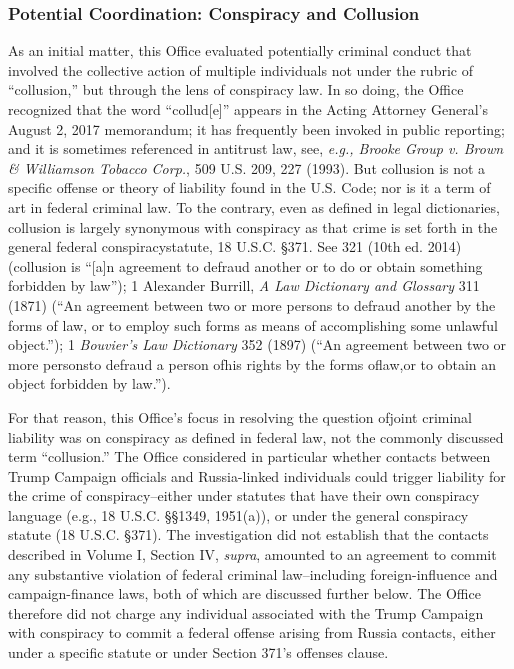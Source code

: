 \subsubsection{Potential Coordination: Conspiracy and Collusion}
As an initial matter, this Office evaluated potentially criminal conduct that involved the collective action of multiple individuals not under the rubric of ``collusion,'' but through the lens of conspiracy law. 
In so doing, the Office recognized that the word ``collud[e]'' appears in the Acting Attorney General's August 2, 2017 memorandum; it has frequently been invoked in public reporting; and it is sometimes referenced in antitrust law, see, \textit{e.g., Brooke Group v. Brown \& Williamson Tobacco Corp.}, 509 U.S. 209, 227 (1993). 
But collusion is not a specific offense or theory of liability found in the U.S. Code; nor is it a term of art in federal criminal law. 
To the contrary, even as defined in legal dictionaries, collusion is largely synonymous with conspiracy as that crime is set forth in the general federal conspiracystatute, 18 U.S.C. \S 371. 
See  321 (10th ed. 2014) (collusion is ``[a]n agreement to defraud another or to do or obtain something forbidden by law''); 1 Alexander Burrill, \textit{A Law Dictionary and Glossary} 311 (1871) (``An agreement between two or more persons to defraud another by the forms of law, or to employ such forms as means of accomplishing some unlawful object.''); 1 \textit{Bouvier's Law Dictionary} 352 (1897) (``An agreement between two or more personsto defraud a person ofhis rights by the forms oflaw,or to obtain an object forbidden by law.'').

For that reason, this Office's focus in resolving the question ofjoint criminal liability was on conspiracy as defined in federal law, not the commonly discussed term ``collusion.'' 
The Office considered in particular whether contacts between Trump Campaign officials and Russia-linked individuals could trigger liability for the crime of conspiracy--either under statutes that have their own conspiracy language (e.g., 18 U.S.C. \S\S 1349, 1951(a)), or under the general conspiracy statute (18 U.S.C. \S 371). 
The investigation did not establish that the contacts described in Volume I, Section IV, \textit{supra}, amounted to an agreement to commit any substantive violation of federal criminal law--including foreign-influence and campaign-finance laws, both of which are discussed further below. 
The Office therefore did not charge any individual associated with the Trump Campaign with conspiracy to commit a federal offense arising from Russia contacts, either under a specific statute or under Section 371's offenses clause.

